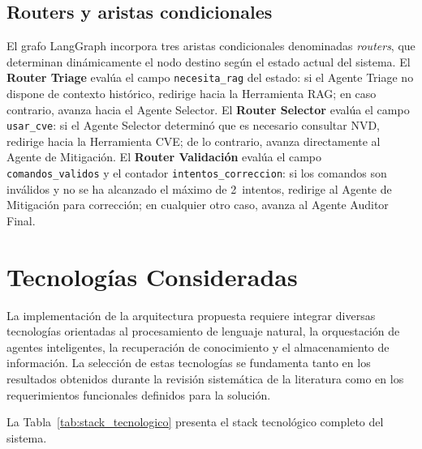 \subsection{Routers y aristas condicionales}

El grafo LangGraph incorpora tres aristas condicionales
denominadas \textit{routers}, que determinan dinámicamente
el nodo destino según el estado actual del sistema. El
\textbf{Router Triage} evalúa el campo \texttt{necesita\_rag}
del estado: si el Agente Triage no dispone de contexto
histórico, redirige hacia la Herramienta RAG; en caso
contrario, avanza hacia el Agente Selector. El \textbf{Router
Selector} evalúa el campo \texttt{usar\_cve}: si el Agente
Selector determinó que es necesario consultar NVD, redirige
hacia la Herramienta CVE; de lo contrario, avanza directamente
al Agente de Mitigación. El \textbf{Router Validación} evalúa
el campo \texttt{comandos\_validos} y el contador
\texttt{intentos\_correccion}: si los comandos son inválidos y
no se ha alcanzado el máximo de 2~intentos, redirige al Agente
de Mitigación para corrección; en cualquier otro caso, avanza
al Agente Auditor Final.






\section {Tecnologías Consideradas}

La implementación de la arquitectura propuesta requiere integrar diversas tecnologías orientadas al procesamiento de lenguaje natural, la orquestación de agentes inteligentes, la recuperación de conocimiento y el almacenamiento de información. La selección de estas tecnologías se fundamenta tanto en los resultados obtenidos durante la revisión sistemática de la literatura como en los requerimientos funcionales definidos para la solución.

La
Tabla~\ref{tab:stack_tecnologico} presenta el stack
tecnológico completo del sistema.
 

